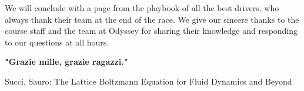 \documentclass[11pt]{article} %
\begin{document}
			We will conclude with a page from the playbook of all the best drivers, 
			who always thank their team at the end of the race.
			We give our sincere thanks to the course staff and the team at Odyssey 
			for sharing their knowledge and responding to our questions at all hours.
			
			\textbf{ "Grazie mille, grazie ragazzi."}


\begin{thebibliography}{9}
Succi, Sauro: The Lattice Boltzmann Equation for Fluid Dynamics and Beyond

\end{thebibliography}
\end{document}
